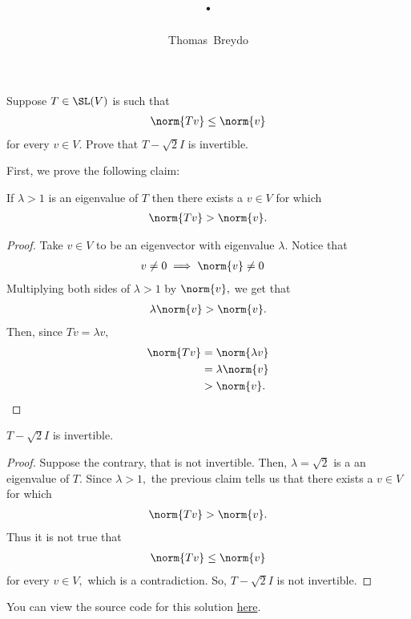 \documentclass{amsart}
\title{\pagenum.\probnum}
\author{Thomas\ Breydo}
\newcommand{\pagenum}{175}
\newcommand{\probnum}{5}
\begin{document}
\maketitle

\begin{problem*}
Suppose $T\in\SL(V)$ is such that
\begin{align*}
    \norm{Tv}\le\norm{v}
\end{align*}
for every $v\in V.$ Prove that $T-\sqrt2I$ is invertible.
\end{problem*}

\vspace{0.5in}

First, we prove the following claim:

\begin{claim*}
If $\lambda>1$ is an eigenvalue of $T$ then there exists a $v\in V$ for which
\begin{align*}
    \norm{Tv}>\norm{v}.
\end{align*}
\end{claim*}
\begin{proof}
Take $v\in V$ to be an eigenvector with eigenvalue $\lambda.$ Notice that
\begin{align*}
    v\ne0 &\implies \norm{v}\ne0
\end{align*}
Multiplying both sides of $\lambda>1$ by $\norm{v},$ we get that
\begin{align*}
    \lambda\norm{v} > \norm{v}.
\end{align*}
Then, since $Tv=\lambda v,$
\begin{align*}
    \norm{Tv} &= \norm{\lambda v} \\
              &= \lambda\norm{v} \\
              &> \norm{v}.\qedhere
\end{align*}
\end{proof}

\begin{claim*}
    $T-\sqrt2I$ is invertible.
\end{claim*}
\begin{proof}
Suppose the contrary, that is not invertible.
Then, $\lambda=\sqrt2$ is a an eigenvalue
of $T.$ Since $\lambda>1,$ the previous claim tells us that
there exists a $v\in V$ for which
\begin{align*}
    \norm{Tv}>\norm{v}.
\end{align*}
Thus it is not true that
\begin{align*}
    \norm{Tv}\le\norm{v}
\end{align*}
for every $v\in V,$ which is a contradiction.
So, $T-\sqrt2I$ is not invertible.
\end{proof}

\vspace{0.5in}

\begin{note*}
You can view the source code for this solution
\href{https://github.com/thomasbreydo/linalg/blob/main/\pagenum_\probnum_Thomas_Breydo.tex}
{here}.
\end{note*}
\end{document}
